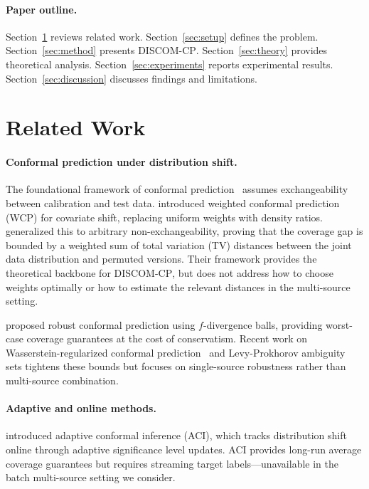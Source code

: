 \documentclass{article}
\newcommand{\DISCOM}{\textsc{DISCOM-CP}}
\begin{document}
\paragraph{Paper outline.} Section~\ref{sec:related} reviews related work. Section~\ref{sec:setup} defines the problem. Section~\ref{sec:method} presents \DISCOM{}. Section~\ref{sec:theory} provides theoretical analysis. Section~\ref{sec:experiments} reports experimental results. Section~\ref{sec:discussion} discusses findings and limitations.

\section{Related Work}
\label{sec:related}

\paragraph{Conformal prediction under distribution shift.}
The foundational framework of conformal prediction~\citep{vovk2005algorithmic} assumes exchangeability between calibration and test data. \citet{tibshirani2019conformal} introduced weighted conformal prediction (WCP) for covariate shift, replacing uniform weights with density ratios. \citet{barber2023conformal} generalized this to arbitrary non-exchangeability, proving that the coverage gap is bounded by a weighted sum of total variation (TV) distances between the joint data distribution and permuted versions. Their framework provides the theoretical backbone for \DISCOM{}, but does not address how to choose weights optimally or how to estimate the relevant distances in the multi-source setting.

\citet{cauchois2024robust} proposed robust conformal prediction using $f$-divergence balls, providing worst-case coverage guarantees at the cost of conservatism. Recent work on Wasserstein-regularized conformal prediction~\citep{xu2025wasserstein} and Levy-Prokhorov ambiguity sets tightens these bounds but focuses on single-source robustness rather than multi-source combination.

\paragraph{Adaptive and online methods.}
\citet{gibbs2021adaptive} introduced adaptive conformal inference (ACI), which tracks distribution shift online through adaptive significance level updates. ACI provides long-run average coverage guarantees but requires streaming target labels---unavailable in the batch multi-source setting we consider.
\end{document}

